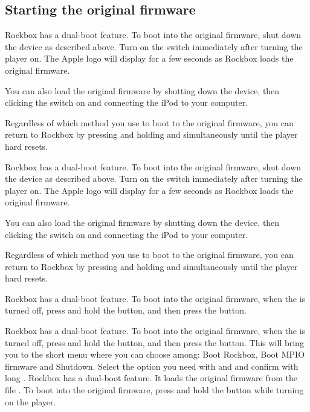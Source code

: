   {
  \subsection{Starting the original firmware}
  \label{ref:Dualboot}
    {
    Rockbox has a dual-boot feature. To boot into the original firmware, shut
    down the device as described above. Turn on the \ButtonHold{} switch
    immediately after turning the player on. The Apple logo will
    display for a few seconds as Rockbox loads the original firmware.
    
    You can also load the original firmware by shutting down the device,
    then clicking the \ButtonHold{} switch on and connecting the iPod
    to your computer.
 
    Regardless of which method you use to boot to the original firmware, you can
    return to Rockbox by pressing and holding \ButtonMenu{} and \ButtonSelect{}
    simultaneously until the player hard resets.
    }

    {
    Rockbox has a dual-boot feature. To boot into the original firmware, shut
    down the device as described above. Turn on the \ButtonHold{} switch
    immediately after turning the player on. The Apple logo will
    display for a few seconds as Rockbox loads the original firmware.
    
    You can also load the original firmware by shutting down the device,
    then clicking the \ButtonHold{} switch on and connecting the iPod
    to your computer.
 
    Regardless of which method you use to boot to the original firmware, you can
    return to Rockbox by pressing and holding \ButtonMenu{} and \ButtonPlay{}
    simultaneously until the player hard resets.
    }

    {
    Rockbox has a dual-boot feature. To boot into the original firmware,
    when the \dap{} is turned off, press and hold the \ButtonRec{} button,
    and then press the \ButtonOn{} button.
    }

    {
    Rockbox has a dual-boot feature. To boot into the original firmware,
    when the \dap{} is turned off, press and hold the \ButtonRec{} button,
    and then press the \ButtonPlay{} button. This will bring you to the
    short menu where you can choose among: Boot Rockbox, Boot MPIO firmware
    and Shutdown. Select the option you need with \ButtonRew{} and \ButtonFF{}
    and confirm with long \ButtonPlay{}.
    }
    {
    Rockbox has a dual-boot feature. It loads the original firmware from
    the file . To boot into the original firmware,
    press and hold the \ButtonLeft{} button while turning on the player.
    }
    
}
